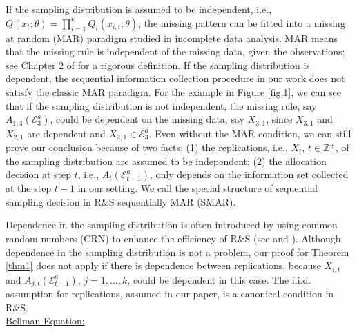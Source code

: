\documentclass[journal]{IEEEtran}
\begin{document}
 If the sampling distribution is assumed to be independent, i.e., $Q(x_t;\theta)=\prod_{i=1}^{k} Q_i(x_{i,t};\theta)$, the missing pattern can be fitted into a missing at random (MAR) paradigm studied in incomplete data analysis.  MAR means that the missing rule is independent of the missing data, given the observations; see Chapter 2 of \cite{kim2013statistical} for a rigorous definition. If the sampling distribution is dependent, the sequential information collection procedure in our work does not satisfy the classic MAR paradigm. For the example in Figure \ref{fig.1}, we can see that if the sampling distribution is not independent, the missing rule, say $A_{1,4}(\mathcal{E}_3^a)$, could be dependent on the missing data, say $X_{3,1}$, since $X_{3,1}$ and $X_{2,1}$ are dependent  and $X_{2,1}\in \mathcal{E}_3^a$. Even without the MAR condition, we can still prove our conclusion because of two facts: (1) the replications, i.e., $X_t$, $t\in\mathbb{Z}^{+}$, of the sampling distribution are assumed to be independent; (2) the allocation decision at step $t$, i.e.,  $A_t(\mathcal{E}_{t-1}^a)$, only depends on the information set collected at the step $t-1$ in our setting. We call the special structure of sequential sampling decision in R\&S  sequentially MAR (SMAR). 
 
 Dependence in the sampling distribution is often introduced by using  common random numbers (CRN) to enhance the efficiency of R\&S (see \cite{fu2007simulation} and \cite{peng2012efficient}). Although dependence in the sampling distribution is not a problem, our proof for Theorem \ref{thm1} does not apply if there is dependence between replications, because $X_{i,t}$ and $A_{j,t}(\mathcal{E}_{t-1}^a)$, $j=1,\ldots,k$, could be dependent in this case. The i.i.d. assumption for replications, assumed in our paper, is a canonical condition in R\&S. \\ 
 
 \noindent\underline{Bellman Equation:}\\
 
\end{document}
